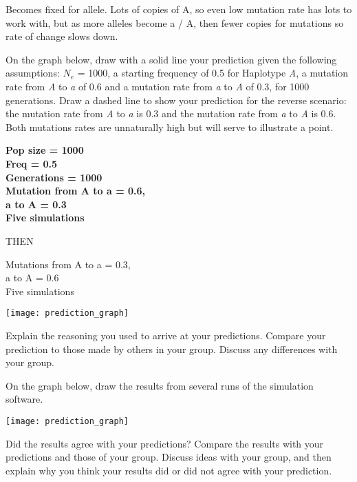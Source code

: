 \documentclass[11pt, addpoints]{exam}
\begin{document}
\begin{questions}
\begin{solution}
Becomes fixed for allele. Lots of copies of A, so even low mutation rate has lots to work with, but as more alleles become a / A, then fewer copies for mutations so rate of change slows down.
\end{solution}

\newpage

\question
On the graph below, draw with a solid line your prediction
given the following assumptions: $N_e$ = 1000, a
starting frequency of 0.5 for Haplotype \emph{A}, a mutation rate from
\emph{A} to \emph{a} of 0.6 and a mutation rate from \emph{a} to
\emph{A} of 0.3, for 1000 generations. Draw a dashed line to show your prediction for the
reverse scenario: the mutation rate from \emph{A} to \emph{a} is 0.3 and
the mutation rate from \emph{a} to \emph{A} is 0.6. Both mutations rates
are unnaturally high but will serve to illustrate a point.

\ifprintanswers
	{\bfseries 
	Pop size = 1000\\
	Freq = 0.5\\
	Generations = 1000\\
	Mutation from A to a = 0.6,\\
	a to A = 0.3\\
	Five simulations
	
	THEN
	
	Mutations from A to a = 0.3,\\
	a to A = 0.6\\
	Five simulations}\vspace{10\baselineskip}
\else
	\begin{center}
		\texttt{[image: prediction\_graph]}
	\end{center}
\fi

\question[2] 
Explain the reasoning you used to arrive at your
predictions. Compare your prediction to those made by others in your
group. Discuss any differences with your group.

\newpage

\question 
On the graph below, draw the results from several runs of
the simulation software.

\begin{center}
	\texttt{[image: prediction\_graph]}
\end{center}

\question Did the results agree with your predictions? Compare the
results with your predictions and those of your group. Discuss ideas
with your group, and then explain why you think your results did or did
not agree with your prediction.


\end{questions}
\end{document}
